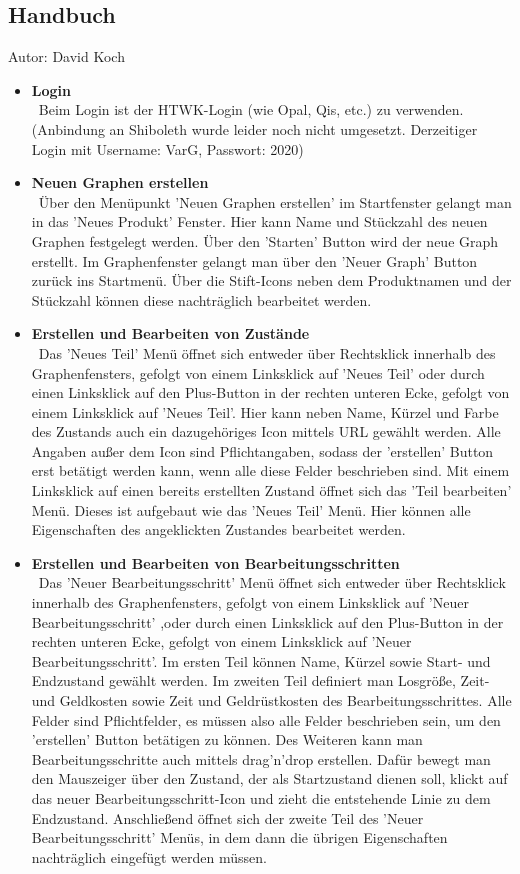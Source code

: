\documentclass[twoside]{report}
\begin{document}
\subsection{Handbuch}
{\small Autor: David Koch}
\begin{itemize}
  \item \textbf{ Login }
    \\\
      Beim Login ist der HTWK-Login (wie Opal, Qis, etc.) zu verwenden. (Anbindung an Shiboleth wurde leider noch nicht umgesetzt. Derzeitiger Login mit Username: VarG, Passwort: 2020)
  \item \textbf{ Neuen Graphen erstellen }
    \\\
      Über den Menüpunkt 'Neuen Graphen erstellen' im Startfenster gelangt man in das 'Neues Produkt' Fenster. Hier kann Name und Stückzahl des neuen Graphen festgelegt werden. Über den 'Starten'  Button wird der neue Graph erstellt. Im Graphenfenster gelangt man über den 'Neuer Graph' Button zurück ins Startmenü. Über die Stift-Icons neben dem Produktnamen und der Stückzahl können diese nachträglich bearbeitet werden.
  \item \textbf{ Erstellen und Bearbeiten von Zustände }
    \\\
      Das 'Neues Teil' Menü öffnet sich entweder über Rechtsklick innerhalb des Graphenfensters, gefolgt von einem Linksklick auf 'Neues Teil' oder durch einen Linksklick auf den Plus-Button in der rechten unteren Ecke, gefolgt von einem Linksklick auf 'Neues Teil'. Hier kann neben Name, Kürzel und Farbe des Zustands auch ein dazugehöriges Icon mittels URL gewählt werden. Alle Angaben außer dem Icon sind Pflichtangaben, sodass der 'erstellen' Button erst betätigt werden kann, wenn alle diese Felder beschrieben sind.
Mit einem Linksklick auf einen bereits erstellten Zustand öffnet sich das 'Teil bearbeiten' Menü. Dieses ist aufgebaut wie das 'Neues Teil' Menü. Hier können alle Eigenschaften des angeklickten Zustandes bearbeitet werden.
  \item \textbf{ Erstellen und Bearbeiten von Bearbeitungsschritten }
    \\\
      Das 'Neuer Bearbeitungsschritt' Menü öffnet sich entweder über Rechtsklick innerhalb des Graphenfensters, gefolgt von einem Linksklick auf 'Neuer Bearbeitungsschritt' ,oder durch einen Linksklick auf den Plus-Button in der rechten unteren Ecke, gefolgt von einem Linksklick auf 'Neuer Bearbeitungsschritt'. Im ersten Teil können Name, Kürzel sowie Start- und Endzustand gewählt werden. Im zweiten Teil definiert man Losgröße, Zeit- und Geldkosten sowie Zeit und Geldrüstkosten des Bearbeitungsschrittes. Alle Felder sind Pflichtfelder, es müssen also alle Felder beschrieben sein, um den 'erstellen' Button betätigen zu können. Des Weiteren kann man Bearbeitungsschritte auch mittels drag'n'drop erstellen. Dafür bewegt man den Mauszeiger über den Zustand, der als Startzustand dienen soll, klickt auf das neuer Bearbeitungsschritt-Icon und zieht die entstehende Linie zu dem Endzustand. Anschließend öffnet sich der zweite Teil des 'Neuer Bearbeitungsschritt' Menüs, in dem dann die übrigen Eigenschaften  nachträglich eingefügt werden müssen.

\end{itemize}
\end{document}
